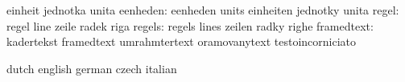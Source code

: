                            einheit                   jednotka
                           unita
                 eenheden: eenheden                  units
                           einheiten                 jednotky
                           unita
                    regel: regel                     line
                           zeile                     radek
                           riga
                   regels: regels                    lines
                           zeilen                    radky
                           righe
               framedtext: kadertekst                framedtext
                           umrahmtertext             oramovanytext
                           testoincorniciato

\stopvariables




\startconstants            dutch                     english
                           german                    czech
                           italian

